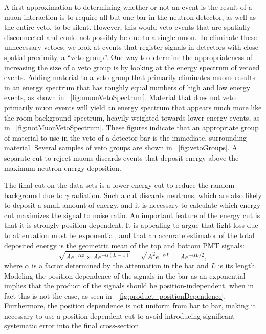 A first approximation to determining whether or not an event is the result of a muon interaction is to require all but one bar in the neutron detector, as well as the entire veto, to be silent.  However, this would veto events that are spatially disconnected and could not possibly be due to a single muon.  To eliminate these unnecessary vetoes, we look at events that register signals in detectors with close spatial proximity, a ``veto group''.  One way to determine the appropriateness of increasing the size of a veto group is by looking at the energy spectrum of vetoed events.  Adding material to a veto group that primarily eliminates muons results in an energy spectrum that has roughly equal numbers of high and low energy events, as shown in {\fig}~\ref{fig:muonVetoSpectrum}.  Material that does not veto primarily muon events will yield an energy spectrum that appears much more like the room background spectrum, heavily weighted towards lower energy events, as in {\fig}~\ref{fig:notMuonVetoSpectrum}.  These figures indicate that an appropriate group of material to use in the veto of a detector bar is the immediate, surrounding material.  Several samples of veto groups are shown in {\fig}~\ref{fig:vetoGroups}.  A separate cut to reject muons discards events that deposit energy above the maximum neutron energy deposition.    

The final cut on the data sets is a lower energy cut to reduce the random background due to $\gamma$ radiation.  Such a cut discards neutrons, which are also likely to deposit a small amount of energy, and it is necessary to calculate which energy cut maximizes the signal to noise ratio.  An important feature of the energy cut is that it is strongly position dependent.  It is appealing to argue that light loss due to attenuation must be exponential, and that an accurate estimator of the total deposited energy is the geometric mean of the top and bottom PMT signals:
\begin{equation}
\sqrt{Ae^{-\alpha x}\times Ae^{-\alpha (L-x)}} = \sqrt{A^2e^{-\alpha L}} = Ae^{-\alpha L/2},
\end{equation}
where $\alpha$ is a factor determined by the attenuation in the bar and $L$ is its length.  Modeling the position dependence of the signals in the bar as an exponential implies that the product of the signals should be position-independent, when in fact this is not the case, as seen in {\fig}~\ref{fig:product_positionDependence}.  Furthermore, the position dependence is not uniform from bar to bar, making it necessary to use a position-dependent cut to avoid introducing significant systematic error into the final cross-section.

